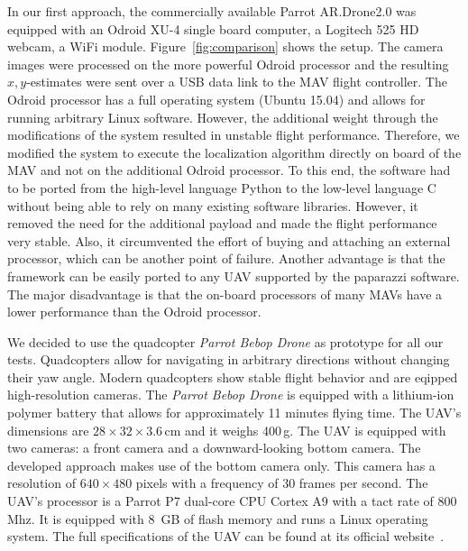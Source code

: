 \documentclass{report}
\begin{document}
In our first approach, the commercially available Parrot AR.Drone2.0
was equipped with an Odroid XU-4 single board computer, a Logitech 525
HD webcam, a WiFi module. Figure~\ref{fig:comparison} shows the
setup. The camera images were processed on the more powerful Odroid
processor and the resulting $x,y$-estimates were sent over a USB data
link to the MAV flight controller. The Odroid processor has a full
operating system (Ubuntu 15.04) and allows for running arbitrary Linux
software.  However, the additional weight through the modifications of
the system resulted in unstable flight performance. Therefore, we
modified the system to execute the localization algorithm directly on
board of the MAV and not on the additional Odroid processor. To this
end, the software had to be ported from the high-level language Python
to the low-level language C without being able to rely on many
existing software libraries.  However, it removed the need for the
additional payload and made the flight performance very stable. Also,
it circumvented the effort of buying and attaching an external
processor, which can be another point of failure. Another advantage
is that the framework can be easily ported to any UAV supported by the
paparazzi software. The major disadvantage is that the on-board
processors of many MAVs have a lower performance than the Odroid
processor.

We decided to use the quadcopter \emph{Parrot Bebop Drone} as
prototype for all our tests. Quadcopters allow for navigating in
arbitrary directions without changing their yaw angle. Modern
quadcopters show stable flight behavior and are eqipped
high-resolution cameras. The \emph{Parrot Bebop Drone} is equipped
with a lithium-ion polymer battery that allows for approximately 11
minutes flying time. The UAV's dimensions are
$28 \times 32 \times 3.6$\,cm and it weighs 400\,g. The UAV is
equipped with two cameras: a front camera and a downward-looking
bottom camera. The developed approach makes use of the bottom camera
only. This camera has a resolution of $640 \times 480$ pixels with a
frequency of 30 frames per second. The UAV's processor is a Parrot P7
dual-core CPU Cortex A9 with a tact rate of 800\,Mhz. It is equipped
with 8~GB of flash memory and runs a Linux operating system. The full
specifications of the UAV can be found at its official
website~\cite{bebop}.
\end{document}
